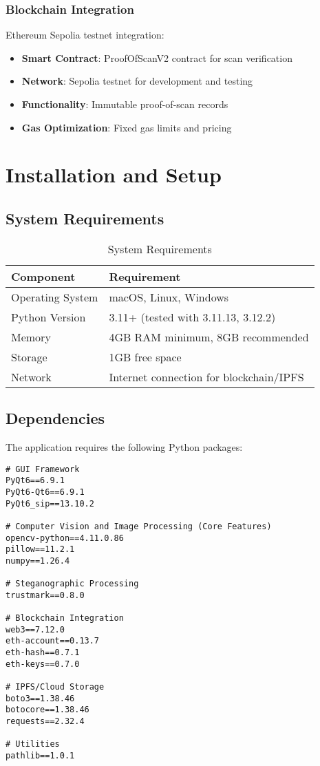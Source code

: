 \documentclass[12pt,a4paper]{article}
\begin{document}
\subsubsection{Blockchain Integration}
Ethereum Sepolia testnet integration:
\begin{itemize}
    \item \textbf{Smart Contract}: ProofOfScanV2 contract for scan verification
    \item \textbf{Network}: Sepolia testnet for development and testing
    \item \textbf{Functionality}: Immutable proof-of-scan records
    \item \textbf{Gas Optimization}: Fixed gas limits and pricing
\end{itemize}

\section{Installation and Setup}

\subsection{System Requirements}

\begin{table}[H]
\centering
\begin{tabular}{@{}ll@{}}
\toprule
\textbf{Component} & \textbf{Requirement} \\
\midrule
Operating System & macOS, Linux, Windows \\
Python Version & 3.11+ (tested with 3.11.13, 3.12.2) \\
Memory & 4GB RAM minimum, 8GB recommended \\
Storage & 1GB free space \\
Network & Internet connection for blockchain/IPFS \\
\bottomrule
\end{tabular}
\caption{System Requirements}
\end{table}

\subsection{Dependencies}

The application requires the following Python packages:

\begin{lstlisting}[caption=Core Dependencies]
# GUI Framework
PyQt6==6.9.1
PyQt6-Qt6==6.9.1
PyQt6_sip==13.10.2

# Computer Vision and Image Processing (Core Features)
opencv-python==4.11.0.86
pillow==11.2.1
numpy==1.26.4

# Steganographic Processing
trustmark==0.8.0

# Blockchain Integration
web3==7.12.0
eth-account==0.13.7
eth-hash==0.7.1
eth-keys==0.7.0

# IPFS/Cloud Storage
boto3==1.38.46
botocore==1.38.46
requests==2.32.4

# Utilities
pathlib==1.0.1
\end{lstlisting}
\end{document}
